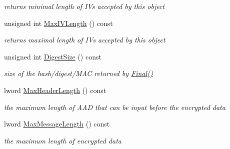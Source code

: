 \begin{DoxyCompactItemize}
\begin{DoxyCompactList}\small\item\em returns minimal length of IVs accepted by this object \item\end{DoxyCompactList}\item 
\hypertarget{class_e_a_x___base_a01628355e0ec40051ba13d81b46a293e}{
unsigned int \hyperlink{class_e_a_x___base_a01628355e0ec40051ba13d81b46a293e}{MaxIVLength} () const }
\label{class_e_a_x___base_a01628355e0ec40051ba13d81b46a293e}

\begin{DoxyCompactList}\small\item\em returns maximal length of IVs accepted by this object \item\end{DoxyCompactList}\item 
\hypertarget{class_e_a_x___base_ab3401d51f56ff0cbdc5689d7eab46367}{
unsigned int \hyperlink{class_e_a_x___base_ab3401d51f56ff0cbdc5689d7eab46367}{DigestSize} () const }
\label{class_e_a_x___base_ab3401d51f56ff0cbdc5689d7eab46367}

\begin{DoxyCompactList}\small\item\em size of the hash/digest/MAC returned by \hyperlink{class_hash_transformation_aa0b8c7a110d8968268fd02ec32b9a8e8}{Final()} \item\end{DoxyCompactList}\item 
\hypertarget{class_e_a_x___base_a94e8a4ffc69e844eaf42ff757b47f944}{
lword \hyperlink{class_e_a_x___base_a94e8a4ffc69e844eaf42ff757b47f944}{MaxHeaderLength} () const }
\label{class_e_a_x___base_a94e8a4ffc69e844eaf42ff757b47f944}

\begin{DoxyCompactList}\small\item\em the maximum length of AAD that can be input before the encrypted data \item\end{DoxyCompactList}\item 
\hypertarget{class_e_a_x___base_a1d1b53b6a2477de16986b2efcddb860f}{
lword \hyperlink{class_e_a_x___base_a1d1b53b6a2477de16986b2efcddb860f}{MaxMessageLength} () const }
\label{class_e_a_x___base_a1d1b53b6a2477de16986b2efcddb860f}

\begin{DoxyCompactList}\small\item\em the maximum length of encrypted data \item\end{DoxyCompactList}\end{DoxyCompactItemize}
